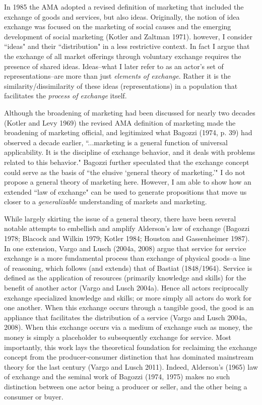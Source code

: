 In 1985 the AMA adopted a revised definition of marketing that included the exchange of goods and services, but also ideas. Originally, the notion of idea exchange was focused on the marketing of social causes and the emerging development of social marketing (Kotler and Zaltman 1971). however, I consider ``ideas" and their ``distribution" in a less restrictive context. In fact I argue that the exchange of all market offerings through voluntary exchange requires the presence of shared ideas. Ideas--what I later refer to as an actor's set of representations--are more than just \emph{elements of exchange}. Rather it is the similarity/dissimilarity of these ideas (representations) in a population that facilitates the \emph{process of exchange} itself. 

Although the broadening of marketing had been discussed for nearly two decades (Kotler and Levy 1969) the revised AMA definition of marketing made the broadening of marketing official, and legitimized what Bagozzi (1974, p. 39) had observed a decade earlier,  ``...marketing is a general function of universal applicability. It is the discipline of exchange behavior, and it deals with problems related to this behavior." Bagozzi further speculated that the exchange concept could serve as the basis of ``the elusive `general theory of marketing.'" I do not propose a general theory of marketing here. However, I am able to show how an extended ``law of exchange" can be used to generate propositions that move us closer to a \emph{generalizable} understanding of markets and marketing. 

While largely skirting the issue of a general theory, there have been several notable attempts to embellish and amplify Alderson's law of exchange (Bagozzi 1978; Blacock and Wilkin 1979; Kotler 1984; Houston and Gassenheimer 1987). In one extension, Vargo and Lusch (2004a, 2008) argue that service for service exchange is a more fundamental process than exchange of physical goods--a line of reasoning, which follows (and extends) that of Bastiat (1848/1964). Service is defined as the application of resources (primarily knowledge and skills) for the benefit of another actor (Vargo and Lusch 2004a). Hence all actors reciprocally exchange specialized knowledge and skills; or more simply all actors do work for one another. When this exchange occurs through a tangible good, the good is an appliance that facilitates the distribution of a service (Vargo and Lusch 2004a, 2008). When this exchange occurs via a medium of exchange such as money, the money is simply a placeholder to subsequently exchange for service. Most importantly, this work lays the theoretical foundation for reclaiming the exchange concept from the producer-consumer distinction that has dominated mainstream theory for the last century (Vargo and Lusch 2011). Indeed, Alderson's (1965) law of exchange and the seminal work of Bagozzi (1974, 1975) makes no such distinction between one actor being a producer or seller, and the other being a consumer or buyer. 

